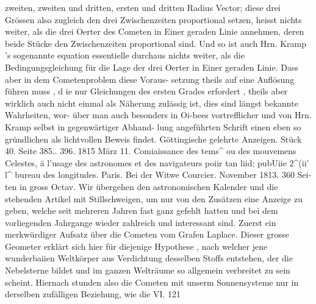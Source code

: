 \documentclass[12pt,a4paper]{article}
\begin{document}
zweiten, zweiten und dritten, ersten und dritten Radius Vector; diese drei Grössen also zugleich den\newline
drei Zwischenzeiten proportional setzen, heisst nichts weiter, als die drei Oerter des Cometen in Einer\newline
geraden Linie annehmen, deren beide Stücke den Zwischenzeiten proportional sind. Und so ist auch\newline
Hrn. Kramp 's sogenannte equation essentielle durchaus nichts weiter, als die Bedingungsgleichung für\newline
die Lage der drei Oerter in Einer geraden Linie. Dass aber in dem Cometenproblem diese Voraus-\newline
setzung theils auf eine Auflösung führen muss , d ie nur Gleichungen des ersten Grades erfordert , theils\newline
aber wirklich auch nicht einmal als Näherung zulässig ist, dies sind längst bekannte Wahrheiten, wor-\newline
über man auch besonders in Oi-bees vortrefflicher und von Hrn. Kramp selbst in gegenwärtiger Abhand-\newline
lung angeführten Schrift einen eben so gründlichen als lichtvollen Beweis findet.\newline
Göttingische gelehrte Anzeigen. Stück 40. Seite 385.. 396. 1815 März 11.\newline
Comiaissance des tems\^{} ou des mouvemens Celestes, ä l'usage des astronomes et des navigateurs poiir\newline
tan liid; pubUiie 2\^{}(ii' l\^{} bureau des longitudes. Paris. Bei der Witwe Courcier. November 1813. 360 Sei-\newline
ten in gross Octav.\newline
Wir übergehen den astronomischen Kalender und die stehenden Artikel mit Stillschweigen, um\newline
nur von den Zusätzen eine Anzeige zu geben, welche seit mehreren Jahren fast ganz gefehlt hatten\newline
und bei dem vorliegenden Jahrgange wieder zahlreich und interessant sind. Zuerst ein merkwürdiger\newline
Aufsatz über die Cometen vom Grafen Laplace. Dieser grosse Geometer erklärt sich hier für diejenige\newline
Hypothese , nach welcher jene wunderbaiien Weltkörper aus Verdichtung desselben Stoffs entstehen, der\newline
die Nebelsterne bildet und im ganzen Welträume so allgemein verbreitet zu sein scheint. Hiernach\newline
stunden also die Cometen mit unserm Sonnensysteme nur in derselben zufälligen Beziehung, wie die\newline
VI. 121\newline
\end{document}
